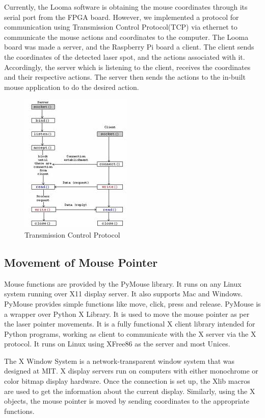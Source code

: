 \documentclass[12pt, a4paper]{article}
\begin{document}
	Currently, the Looma software is obtaining the mouse coordinates through its serial port from the FPGA board. However, we implemented a protocol for communication using Transmission Control Protocol(TCP) via ethernet to communicate the mouse actions and coordinates to the computer. The Looma board was made a server, and the Raspberry Pi board a client. The client sends the coordinates of the detected laser spot, and the actions associated with it. Accordingly, the server which is listening to the client, receives the coordinates and their respective actions. The server then sends the actions to the in-built mouse application to do the desired action. 
	
\begin{figure}[htp]
\centering
\includegraphics[scale=1]{tcp.jpeg}
\caption{Transmission Control Protocol}
\label{}
\end{figure}

\subsection{Movement of Mouse Pointer}
Mouse functions are provided by the PyMouse library. It runs on any Linux system running over X11 display server. It also supports Mac and Windows. PyMouse provides simple functions like move, click, press and release. PyMouse is a wrapper over Python X Library. It is used to move the mouse pointer as per the laser pointer movements. It is a fully functional X client library intended for Python programs, working as client to communicate with the X server via the X protocol. It runs on Linux using XFree86 as the server and most Unices.


The X Window System is a network-transparent window system that was designed at MIT. X display servers run on computers with either monochrome or color bitmap display hardware. Once the connection is set up, the Xlib macros are used to get the information about the current display. Similarly, using the X objects, the mouse pointer is moved by sending coordinates to the appropriate functions. 
\end{document}
